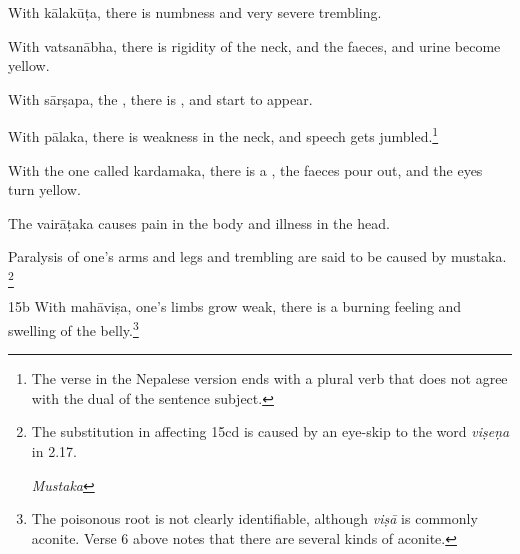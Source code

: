 \begin{translation}
    
    With
    \gls{kālakūṭa},
 there is numbness and very severe trembling.

%
    With
    \gls{vatsanābha},
there is rigidity of the neck, and the faeces,
    and urine become yellow.
    
With \gls{sārṣapa}, 
the , there is
, and  start to appear.

With \gls{pālaka}, %
there is weakness in the neck, and speech gets jumbled.\footnote{The
    verse in the Nepalese version ends with a plural verb that does not
    agree with the dual of the sentence subject.}
    
With the one called \gls{kardamaka}, there is a
, the faeces pour out, and  the eyes turn
yellow. 

The \gls{vairāṭaka} causes pain in
the body and illness in the head. 

Paralysis of one's arms and legs and trembling are said to be
caused by \gls{mustaka}.%
\footnote{The substitution in  affecting 15cd is
    caused by an eye-skip to the word \emph{viṣeṇa} in 2.17. 
    
    \emph{Mustaka}} 

\item[15b] 
With \gls{mahāviṣa}, one's limbs grow weak, there is a burning feeling
and swelling of the belly.\footnote{The poisonous root 
    is not clearly identifiable, although \emph{viṣā} is commonly aconite.
    Verse 6 above notes that there are several kinds of aconite.}
        

\end{translation}
